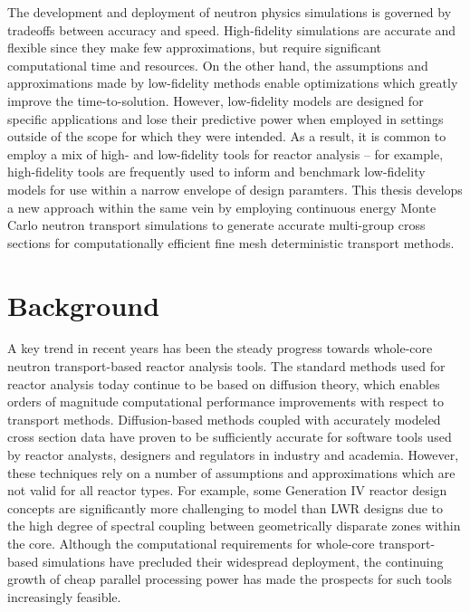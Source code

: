 The development and deployment of neutron physics simulations is governed by tradeoffs between accuracy and speed. High-fidelity simulations are accurate and flexible since they make few approximations, but require significant computational time and resources. On the other hand, the assumptions and approximations made by low-fidelity methods enable optimizations which greatly improve the time-to-solution. However, low-fidelity models are designed for specific applications and lose their predictive power when employed in settings outside of the scope for which they were intended. As a result, it is common to employ a mix of high- and low-fidelity tools for reactor analysis -- for example, high-fidelity tools are frequently used to inform and benchmark low-fidelity models for use within a narrow envelope of design paramters. This thesis develops a new approach within the same vein by employing continuous energy Monte Carlo neutron transport simulations to generate accurate multi-group cross sections for computationally efficient fine mesh deterministic transport methods.


\section{Background}
\label{sec:chap1-background}

A key trend in recent years has been the steady progress towards whole-core neutron transport-based reactor analysis tools. The standard methods used for reactor analysis today continue to be based on diffusion theory, which enables orders of magnitude computational performance improvements with respect to transport methods. Diffusion-based methods coupled with accurately modeled cross section data have proven to be sufficiently accurate for software tools used by reactor analysts, designers and regulators in industry and academia. However, these techniques rely on a number of assumptions and approximations which are not valid for all reactor types. For example, some Generation IV reactor design concepts are significantly more challenging to model than \ac{LWR} designs due to the high degree of spectral coupling between geometrically disparate zones within the core. Although the computational requirements for whole-core transport-based simulations have precluded their widespread deployment, the continuing growth of cheap parallel processing power has made the prospects for such tools increasingly feasible.

